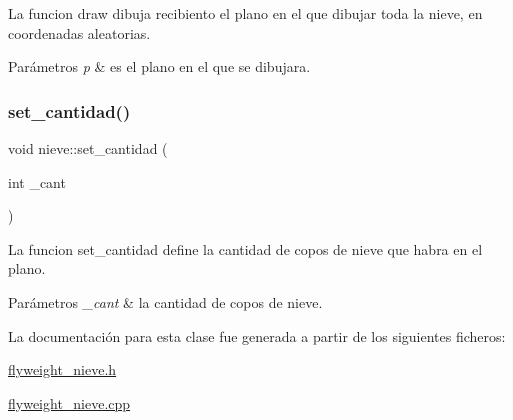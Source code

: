 La funcion draw dibuja recibiento el plano en el que dibujar toda la nieve, en coordenadas aleatorias. 
\begin{DoxyParams}{Parámetros}
{\em p} & es el plano en el que se dibujara. \\
\hline
\end{DoxyParams}
\mbox{\label{classnieve_a447ff743623611b1dd3bfe617e40d52e}} 
\subsubsection{\texorpdfstring{set\+\_\+cantidad()}{set\_cantidad()}}
{\footnotesize\ttfamily void nieve\+::set\+\_\+cantidad (\begin{DoxyParamCaption}\item[{int}]{\+\_\+cant }\end{DoxyParamCaption})}

La funcion set\+\_\+cantidad define la cantidad de copos de nieve que habra en el plano. 
\begin{DoxyParams}{Parámetros}
{\em \+\_\+cant} & la cantidad de copos de nieve. \\
\hline
\end{DoxyParams}


La documentación para esta clase fue generada a partir de los siguientes ficheros\+:\begin{DoxyCompactItemize}
\item 
\hyperlink{flyweight__nieve_8h}{flyweight\+\_\+nieve.\+h}\item 
\hyperlink{flyweight__nieve_8cpp}{flyweight\+\_\+nieve.\+cpp}\end{DoxyCompactItemize}
